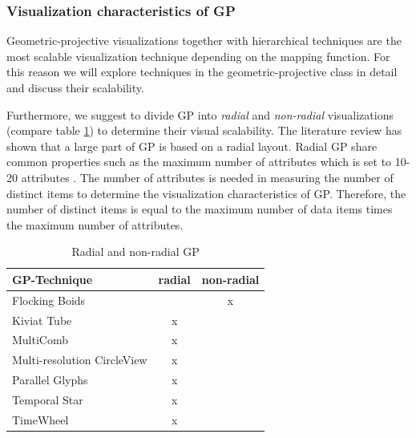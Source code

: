  

\subsubsection{Visualization characteristics of \gls{GP}} \label{GP-Techniques}
Geometric-projective visualizations together with hierarchical techniques are the most scalable visualization technique depending on the mapping function. For this reason we will explore techniques in the geometric-projective class in detail and discuss their scalability.


Furthermore, we suggest to divide \gls{GP} into \textit{radial} and \textit{non-radial} visualizations (compare table \ref{table:radialTable}) to determine their visual scalability. The literature review has shown that a large part of \gls{GP} is based on a radial layout. Radial \gls{GP} share common properties such as the maximum number of attributes which is set to 10-20 attributes  \cite{Diehl2010}. The number of attributes is needed in measuring the number of distinct items to determine the visualization characteristics of \gls{GP}. Therefore, the number of distinct items is equal to the maximum number of data items times the maximum number of attributes.\par


\begin{table}[H]
	\centering
	\caption[Radial and non-radial \gls{GP}]{Radial and non-radial \gls{GP}}
	\label{table:radialTable}
	\begin{tabular}{lcc}
	\hline
	\gls{GP}-Technique & radial & non-radial \\
	\hline
	Flocking Boids &  & x \\
	Kiviat Tube & x &  \\
	MultiComb & x &  \\
	Multi-resolution CircleView & x &  \\
	Parallel Glyphs & x &  \\
    Temporal Star & x &  \\
	TimeWheel & x & \\
	\hline
	\end{tabular}
\end{table}


